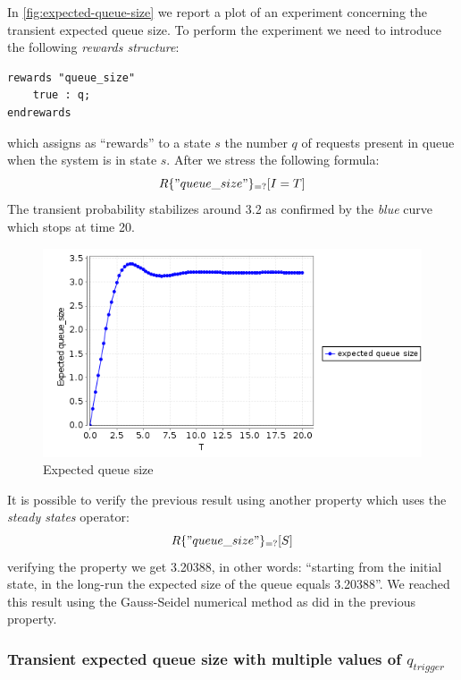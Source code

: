 In \autoref{fig:expected-queue-size} we report a plot of an experiment
concerning the transient expected queue size. To perform the
experiment we need to introduce the following \emph{rewards
  structure}:
\begin{verbatim}
rewards "queue_size"
	true : q;
endrewards
\end{verbatim}
which assigns as ``rewards'' to a state $s$ the number $q$ of requests
present in queue when the system is in state $s$. After we stress the
following formula:
\begin{displaymath}
  R\{"queue\_size"\}_{=?} [ I=T ]
\end{displaymath}
The transient probability stabilizes around 3.2 as confirmed by the
\emph{blue} curve which stops at time 20.
\begin{figure}[htb]
  \centering
  \includegraphics[width=13cm]{quantitative-project/expected-queue-size.png}
  \caption{Expected queue size}
  \label{fig:expected-queue-size}
\end{figure}
It is possible to verify the previous result using another property
which uses the \emph{steady states} operator:
\begin{displaymath}
  R\{"queue\_size"\}_{=?} [ S ]
\end{displaymath}
verifying the property we get 3.20388, in other words: ``starting from
the initial state, in the long-run the expected size of the queue
equals 3.20388''. We reached this result using the Gauss-Seidel
numerical method as did in the previous property.

\subsubsection{Transient expected queue size with multiple values of
  $q_{trigger}$}


